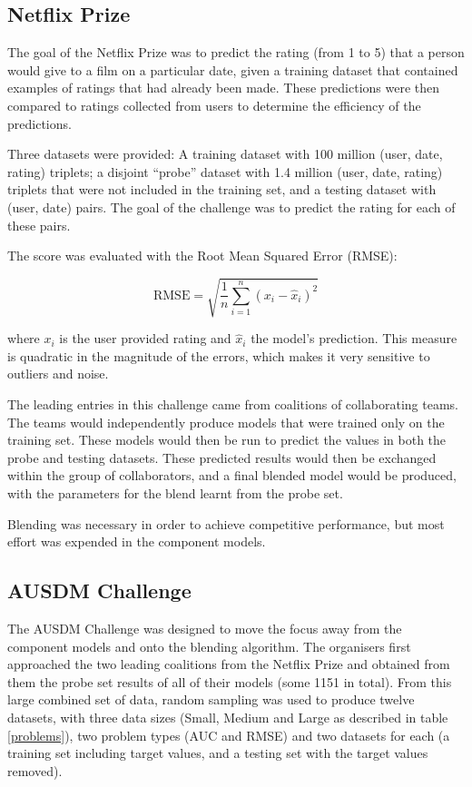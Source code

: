 \documentclass{article}
\begin{document}
\subsection{Netflix Prize}

The goal of the Netflix Prize was to predict the rating (from 1 to 5) that a person would give to a film on a particular date, given a training dataset that contained examples of ratings that had already been made.  These predictions were then compared to ratings collected from users to determine the efficiency of the predictions.

Three datasets were provided: A training dataset with 100 million (user, date, rating) triplets; a disjoint ``probe'' dataset with 1.4 million (user, date, rating) triplets that were not included in the training set, and a testing dataset with (user, date) pairs.  The goal of the challenge was to predict the rating for each of these pairs.

The score was evaluated with the Root Mean Squared Error (RMSE):

\begin{equation}
\mathrm{RMSE} = \sqrt{\frac{1}{n} \sum_{i=1}^{n} (x_i - \hat{x}_i)^2}
\label{RMSE}
\end{equation}

where $x_i$ is the user provided rating and $\hat{x}_i$ the model's prediction.  This measure is quadratic in the magnitude of the errors, which makes it very sensitive to outliers and noise.

The leading entries in this challenge came from coalitions of collaborating teams.  The teams would independently produce models that were trained only on the training set.  These models would then be run to predict the values in both the probe and testing datasets.  These predicted results would then be exchanged within the group of collaborators, and a final blended model would be produced, with the parameters for the blend learnt from the probe set.

Blending was necessary in order to achieve competitive performance, but most effort was expended in the component models.

\subsection{AUSDM Challenge}

The AUSDM Challenge was designed to move the focus away from the component models and onto the blending algorithm.  The organisers first approached the two leading coalitions from the Netflix Prize and obtained from them the probe set results of all of their models (some 1151 in total).  From this large combined set of data, random sampling was used to produce twelve datasets, with three data sizes (Small, Medium and Large as described in table \ref{problems}), two problem types (AUC and RMSE) and two datasets for each (a training set including target values, and a testing set with the target values removed).
\end{document}

